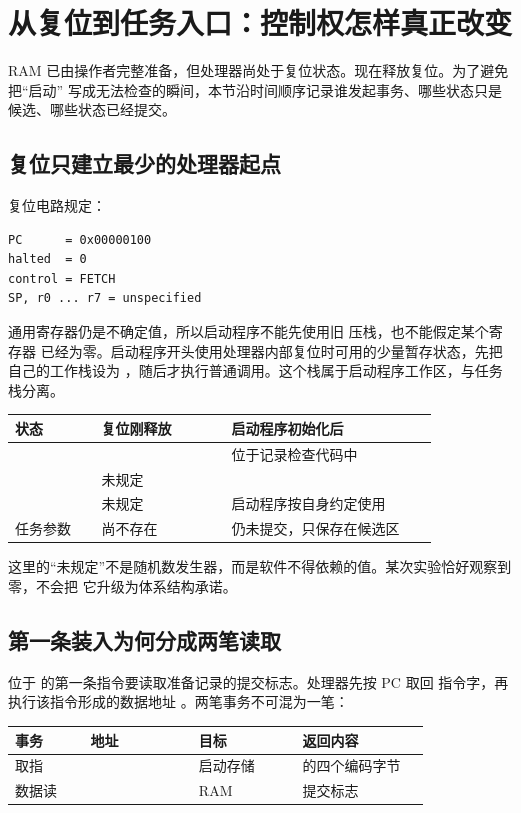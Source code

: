 \section{从复位到任务入口：控制权怎样真正改变}

RAM 已由操作者完整准备，但处理器尚处于复位状态。现在释放复位。为了避免把“启动”
写成无法检查的瞬间，本节沿时间顺序记录谁发起事务、哪些状态只是候选、哪些状态已经提交。

\subsection{复位只建立最少的处理器起点}

复位电路规定：

\begin{lstlisting}
PC      = 0x00000100
halted  = 0
control = FETCH
SP, r0 ... r7 = unspecified
\end{lstlisting}

通用寄存器仍是不确定值，所以启动程序不能先使用旧  压栈，也不能假定某个寄存器
已经为零。启动程序开头使用处理器内部复位时可用的少量暂存状态，先把自己的工作栈设为
，随后才执行普通调用。这个栈属于启动程序工作区，与任务栈分离。

\begin{longtable}{|L{0.18\linewidth}|L{0.27\linewidth}|L{0.43\linewidth}|}
\hline
{}
状态 & 复位刚释放 & 启动程序初始化后 \\ \hline
{} &  & 位于记录检查代码中 \\ \hline
{} & 未规定 &  \\ \hline
{} & 未规定 & 启动程序按自身约定使用 \\ \hline
任务参数 & 尚不存在 & 仍未提交，只保存在候选区 \\ \hline
\end{longtable}

这里的“未规定”不是随机数发生器，而是软件不得依赖的值。某次实验恰好观察到零，不会把
它升级为体系结构承诺。

\subsection{第一条装入为何分成两笔读取}

位于  的第一条指令要读取准备记录的提交标志。处理器先按 PC 取回
指令字，再执行该指令形成的数据地址 。两笔事务不可混为一笔：

\begin{longtable}{|L{0.16\linewidth}|L{0.23\linewidth}|L{0.22\linewidth}|L{0.27\linewidth}|}
\hline
{}
事务 & 地址 & 目标 & 返回内容 \\ \hline
取指 &  & 启动存储 &  的四个编码字节 \\ \hline
数据读 &  & RAM & 提交标志  \\ \hline
\end{longtable}

